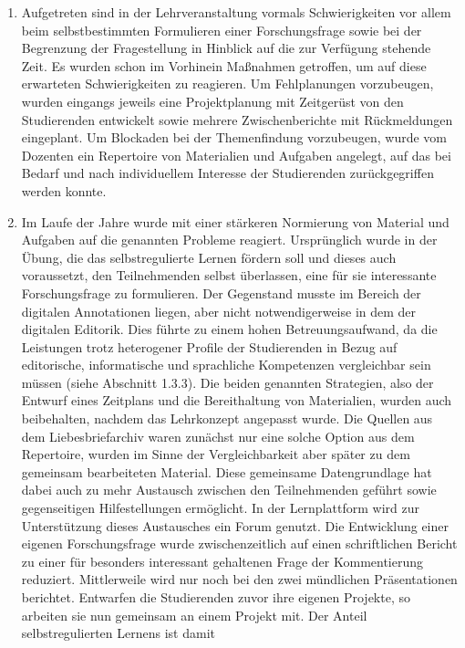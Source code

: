 \documentclass[
          a4paper,
        ]{article}
\begin{document}
\begin{enumerate}
\def\labelenumi{\arabic{enumi}.}
\item
  Aufgetreten sind in der Lehrveranstaltung vormals Schwierigkeiten vor
  allem beim selbstbestimmten Formulieren einer Forschungsfrage sowie
  bei der Begrenzung der Fragestellung in Hinblick auf die zur Verfügung
  stehende Zeit. Es wurden schon im Vorhinein Maßnahmen getroffen, um
  auf diese erwarteten Schwierigkeiten zu reagieren. Um Fehlplanungen
  vorzubeugen, wurden eingangs jeweils eine Projektplanung mit
  Zeitgerüst von den Studierenden entwickelt sowie mehrere
  Zwischenberichte mit Rückmeldungen eingeplant. Um Blockaden bei der
  Themenfindung vorzubeugen, wurde vom Dozenten ein Repertoire von
  Materialien und Aufgaben angelegt, auf das bei Bedarf und nach
  individuellem Interesse der Studierenden zurückgegriffen werden
  konnte.
\item
  Im Laufe der Jahre wurde mit einer stärkeren Normierung von Material
  und Aufgaben auf die genannten Probleme reagiert. Ursprünglich wurde
  in der Übung, die das selbstregulierte Lernen fördern soll und dieses
  auch voraussetzt, den Teilnehmenden selbst überlassen, eine für sie
  interessante Forschungsfrage zu formulieren. Der Gegenstand musste im
  Bereich der digitalen Annotationen liegen, aber nicht notwendigerweise
  in dem der digitalen Editorik. Dies führte zu einem hohen
  Betreuungsaufwand, da die Leistungen trotz heterogener Profile der
  Studierenden in Bezug auf editorische, informatische und sprachliche
  Kompetenzen vergleichbar sein müssen (siehe Abschnitt 1.3.3). Die
  beiden genannten Strategien, also der Entwurf eines Zeitplans und die
  Bereithaltung von Materialien, wurden auch beibehalten, nachdem das
  Lehrkonzept angepasst wurde. Die Quellen aus dem Liebesbriefarchiv
  waren zunächst nur eine solche Option aus dem Repertoire, wurden im
  Sinne der Vergleichbarkeit aber später zu dem gemeinsam bearbeiteten
  Material. Diese gemeinsame Datengrundlage hat dabei auch zu mehr
  Austausch zwischen den Teilnehmenden geführt sowie gegenseitigen
  Hilfestellungen ermöglicht. In der Lernplattform wird zur
  Unterstützung dieses Austausches ein Forum genutzt. Die Entwicklung
  einer eigenen Forschungsfrage wurde zwischenzeitlich auf einen
  schriftlichen Bericht zu einer für besonders interessant gehaltenen
  Frage der Kommentierung reduziert. Mittlerweile wird nur noch bei den
  zwei mündlichen Präsentationen berichtet. Entwarfen die Studierenden
  zuvor ihre eigenen Projekte, so arbeiten sie nun gemeinsam an einem
  Projekt mit. Der Anteil selbstregulierten Lernens ist damit

\end{enumerate}
\end{document}
